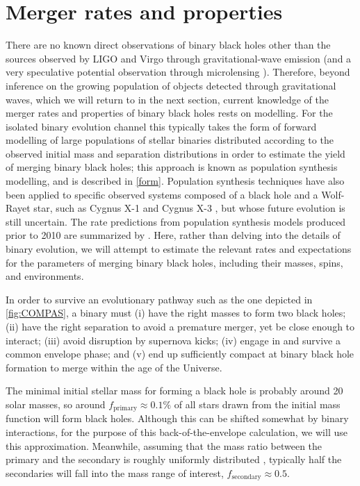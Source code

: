 \documentclass[iop,onecolumn]{revtex4}
\begin{document}
\section{Merger rates and properties}\label{merge}

There are no known direct observations of binary black holes other than the sources observed by LIGO and Virgo through gravitational-wave emission (and a very speculative potential observation through microlensing \citep{Dong:2007}).  Therefore, beyond inference on the growing population of objects detected through gravitational waves, which we will return to in the next section, current knowledge of the merger rates and properties of binary black holes rests on modelling.  For the isolated binary evolution channel this typically takes the form of forward modelling of large populations of stellar binaries distributed according to the observed initial mass and separation distributions in order to estimate the yield of merging binary black holes; this approach is known as population synthesis modelling, and is described in \autoref{form}.  Population synthesis techniques have also been applied to specific observed systems composed of a black hole and a Wolf-Rayet star, such as Cygnus X-1 \citep{Bulik:2008} and Cygnus X-3 \citep{CygnusX3:2012}, but whose future evolution is still uncertain.  The rate predictions from population synthesis models produced prior to 2010 are summarized by \citet{ratesdoc}.  Here, rather than delving into the details of binary evolution, we will attempt to estimate the relevant rates and expectations for the parameters of merging binary black holes, including their masses, spins, and environments.

In order to survive an evolutionary pathway such as the one depicted in \autoref{fig:COMPAS}, a binary must (i) have the right masses to form two black holes; (ii) have the right separation to avoid a premature merger, yet be close enough to interact; (iii) avoid disruption by supernova kicks; (iv) engage in and survive a common envelope phase; and (v) end up sufficiently compact at binary black hole formation to merge within the age of the Universe.  

The minimal initial stellar mass for forming a black hole is probably around 20 solar masses, so around $f_\textrm{primary} \approx 0.1\%$ of all stars drawn from the \cite{Kroupa:2002} initial mass function will form black holes. Although this can be shifted somewhat by binary interactions, for the purpose of this back-of-the-envelope calculation, we will use this approximation. Meanwhile, assuming that the mass ratio between the primary and the secondary is roughly uniformly distributed \citep{Sana:2012}, typically half the secondaries will fall into the mass range of interest, $f_\textrm{secondary} \approx 0.5$.  
\end{document}
